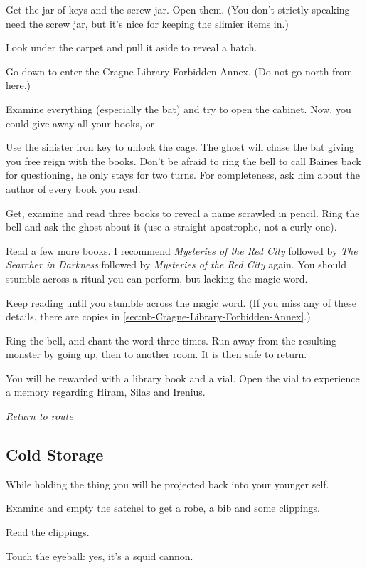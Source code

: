 \documentclass[a5paper]{extarticle}
\begin{document}
Get the jar of keys and the screw jar. Open them.
(You don't strictly speaking need the screw jar,
but it's nice for keeping the slimier items in.)

Look under the carpet and pull it aside to reveal a hatch.

Go down to enter the Cragne Library Forbidden Annex.
(Do not go north from here.)

Examine everything (especially the bat) and try to open the cabinet.
Now, you could give away all your books, or\xelip

Use the sinister iron key to unlock the cage.
The ghost will chase the bat giving you free reign with the books.
Don't be afraid to ring the bell to call Baines back for questioning,
he only stays for two turns.
For completeness, ask him about the author of every book you read.

Get, examine and read three books to reveal a name scrawled in pencil.
Ring the bell and ask the ghost about it (use a straight apostrophe, not a curly one).

Read a few more books.
I recommend \emph{Mysteries of the Red City} followed by \emph{The Searcher in Darkness}
followed by \emph{Mysteries of the Red City} again.
You should stumble across a ritual you can perform, but lacking the magic word.

Keep reading until you stumble across the magic word. (If you miss any of these
details, there are copies in \cref{sec:nb-Cragne-Library-Forbidden-Annex}.)

Ring the bell, and chant the word three times.
Run away from the resulting monster by going up, then to another room.
It is then safe to return.

You will be rewarded with a library book and a vial.
Open the vial to experience a memory regarding Hiram, Silas and Irenius.

\hyperref[sec:route-8]{\emph{Return to route}}

\newpage
\subsection{Cold Storage}\label{sec:sol-Cold-Storage}

While holding the thing you will be projected back into your younger self.

Examine and empty the satchel to get a robe, a bib and some clippings.

Read the clippings.

Touch the eyeball: yes, it's a squid cannon.
\end{document}
